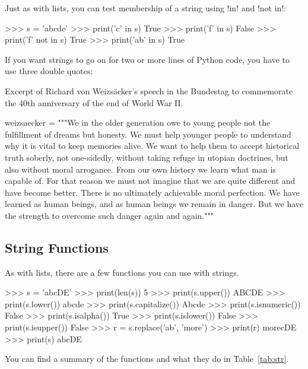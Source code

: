 \documentclass[11pt]{cselabheader}
\begin{document}
Just as with lists, you can test membership of a string using \pythoninline!in! and
\pythoninline!not in!:

\begin{pyconcode}
>>> s = 'abcde'
>>> print('c' in s)
True
>>> print('f' in s)
False
>>> print('f' not in s)
True
>>> print('ab' in s)
True
\end{pyconcode}

If you want strings to go on for two or more lines of Python code, you have to use three double
quotes:

\begin{listing}[H]
  \caption{Excerpt of Richard von Weizs\"{a}cker's speech in
the Bundestag to commemorate the 40th anniversary of the end of World War II.}
\begin{python3code}
weizsaecker = """We in the older generation owe to young people not the 
fulfillment of dreams but honesty. We must help younger people to 
understand why it is vital to keep memories alive. We want to help them 
to accept historical truth soberly, not one-sidedly, without taking 
refuge in utopian doctrines, but also without moral arrogance. From our
own history we learn what man is capable of. For that reason we must not
imagine that we are quite different and have become better. There is no
ultimately achievable moral perfection. We have learned as human beings,
and as human beings we remain in danger. But we have the strength to 
overcome such danger again and again."""
\end{python3code}
\end{listing}

\subsection{String Functions}

As with lists, there are a few functions you can use with strings.

\begin{pyconcode}
>>> s = 'abcDE'
>>> print(len(s))
5
>>> print(s.upper())
ABCDE
>>> print(s.lower())
abcde
>>> print(s.capitalize())
Abcde
>>> print(s.isnumeric())
False
>>> print(s.isalpha())
True
>>> print(s.islower())
False
>>> print(s.isupper())
False
>>> r = s.replace('ab', 'more')
>>> print(r)
morecDE
>>> print(s)
abcDE
\end{pyconcode}

You can find a summary of the functions and what they do in Table~\ref{tab:str}.
\end{document}
